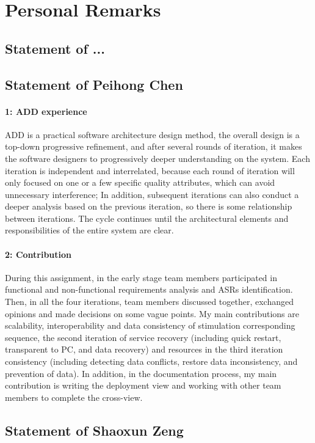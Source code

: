 \documentclass{article}
\begin{document}
	\section{Personal Remarks}
	\subsection{Statement of ...}
	\subsection{Statement of Peihong Chen}
	\paragraph{1: ADD experience}
	ADD is a practical software architecture design method, the overall design is a top-down progressive refinement, and after several rounds of iteration, it makes the software designers to progressively deeper understanding on the system. Each iteration is independent and interrelated, because each round of iteration will only focused on one or a few specific quality attributes, which can avoid unnecessary interference; In addition, subsequent iterations can also conduct a deeper analysis based on the previous iteration, so there is some relationship between iterations. The cycle continues until the architectural elements and responsibilities of the entire system are clear.
	\paragraph{2: Contribution}
	During this assignment, in the early stage team members participated in functional and non-functional requirements analysis and ASRs identification. Then, in all the four iterations, team members discussed together, exchanged opinions and made decisions on some vague points. My main contributions are scalability, interoperability and data consistency of stimulation corresponding sequence, the second iteration of service recovery (including quick restart, transparent to PC, and data recovery) and resources in the third iteration consistency (including detecting data conflicts, restore data inconsistency, and prevention of data). In addition, in the documentation process, my main contribution is  writing the deployment view and working with other team members to complete the cross-view.

	\subsection{Statement of Shaoxun Zeng}
\end{document}
